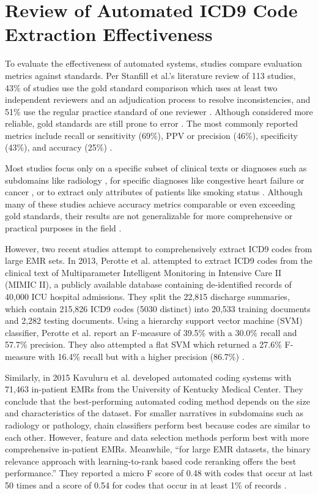 \documentclass[sigconf]{acmart}
\begin{document}
\section{Review of Automated ICD9 Code Extraction Effectiveness }
To evaluate the effectiveness of automated systems, studies compare evaluation metrics against standards. Per Stanfill et al.'s literature review of 113 studies, 43\% of studies use the gold standard comparison which uses at least two independent reviewers and an adjudication process to resolve inconsistencies, and 51\% use the regular practice standard of one reviewer \cite{stanfill2010systematic}. Although considered more reliable, gold standards are still prone to error \cite{perotte2013diagnosis}. The most commonly reported metrics include recall or sensitivity (69\%), PPV or precision (46\%), specificity (43\%), and accuracy (25\%) \cite{stanfill2010systematic}.

Most studies focus only on a specific subset of clinical texts or diagnoses such as subdomains like radiology \cite{pons2016natural}, for specific diagnoses like congestive heart failure \cite{friedlin2006natural} or cancer \cite{mamlin2003automated}, or to extract only attributes of patients like smoking status \cite{uzuner2008identifying}. Although many of these studies achieve accuracy metrics comparable or even exceeding gold standards, their results are not generalizable for more comprehensive or practical purposes in the field \cite{stanfill2010systematic}.

However, two recent studies attempt to comprehensively extract ICD9 codes from large EMR sets. In 2013, Perotte et al. attempted to extract ICD9 codes from the clinical text of Multiparameter Intelligent Monitoring in Intensive Care II (MIMIC II), a publicly available database containing de-identified records of 40,000 ICU hospital admissions. They split the 22,815 discharge summaries, which contain 215,826 ICD9 codes (5030 distinct) into 20,533 training documents and 2,282 testing documents. Using a hierarchy support vector machine (SVM) classifier, Perotte et al. report an F-measure of 39.5\% with a 30.0\% recall and 57.7\% precision. They also attempted a flat SVM which returned a 27.6\% F-measure with 16.4\% recall but with a higher precision (86.7\%) \cite{perotte2013diagnosis}.

Similarly, in 2015 Kavuluru et al. developed automated coding systems with 71,463 in-patient EMRs from the University of Kentucky Medical Center. They conclude that the best-performing automated coding method depends on the size and characteristics of the dataset. For smaller narratives in subdomains such as radiology or pathology, chain classifiers perform best because codes are similar to each other. However, feature and data selection methods perform best with more comprehensive in-patient EMRs. Meanwhile, ``for large EMR datasets, the binary relevance approach with learning-to-rank based code reranking offers the best performance.'' They reported a micro F score of 0.48 with codes that occur at last 50 times and a score of 0.54 for codes that occur in at least 1\% of records \cite{kavuluru2015empirical}.
\end{document}
